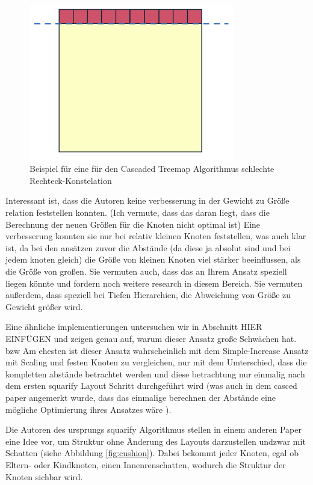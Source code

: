 \begin{figure}
    \centering
    \includegraphics[width=0.8\textwidth]{images/cascadedBadExample.png}
    \caption{Beispiel für eine für den Cascaded Treemap Algorithmus schlechte Rechteck-Konstelation}
    \label{fig:cascadedBadExample}
\end{figure}

Interessant ist, dass die Autoren keine verbesserung in der Gewicht zu Größe relation feststellen konnten. (Ich vermute, dass das daran liegt, dass die Berechnung der neuen Größen für die Knoten nicht optimal ist) 
Eine verbesserung konnten sie nur bei relativ kleinen Knoten feststellen, was auch klar ist, da bei den ansätzen zuvor die Abstände (da diese ja absolut sind und bei jedem knoten gleich) die Größe von kleinen Knoten viel stärker beeinflussen, als die Größe von großen. Sie vermuten auch, dass das an Ihrem Ansatz speziell liegen könnte und fordern noch weitere research in diesem Bereich.
Sie vermuten außerdem, dass speziell bei Tiefen Hierarchien, die Abweichung von Größe zu Gewicht größer wird.  

Eine ähnliche implementierungen untersuchen wir in Abschnitt HIER EINFÜGEN und zeigen genau auf, warum dieser Ansatz große Schwächen hat. bzw 
Am ehesten ist dieser Ansatz wahrscheinlich mit dem Simple-Increase Ansatz mit Scaling und festen Knoten zu vergleichen, nur mit dem Umterschied, dass die kompletten abstände betrachtet werden und diese betrachtung nur einmalig nach dem ersten squarify Layout Schritt durchgeführt wird (was auch in dem casced paper angemerkt wurde, dass das einmalige berechnen der Abstände eine mögliche Optimierung ihres Ansatzes wäre \cite[6]{lu2008cascaded}).



Die Autoren des ursprungs squarify Algorithmus \cite{bruls2000squarified} stellen in einem anderen Paper \cite{cushionTreemaps} eine Idee vor, um Struktur ohne Änderung des Layouts darzustellen undzwar mit Schatten (siehe Abbildung \ref{fig:cushion}). Dabei bekommt jeder Knoten, egal ob Eltern- oder Kindknoten, einen Innenrenschatten, wodurch die Struktur der Knoten sichbar wird.

